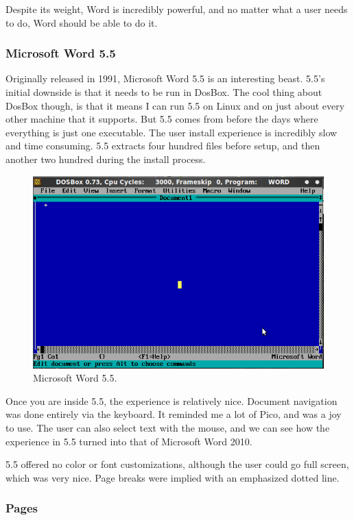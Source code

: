\documentclass[10pt]{article}
\begin{document}
Despite its weight, Word is incredibly powerful, and no matter what a user needs to do, Word should be able to do it.

\subsubsection{Microsoft Word 5.5}

Originally released in 1991\cite{infoworld}, Microsoft Word 5.5 is an interesting beast. 5.5's initial downside is that it needs to be run in DosBox. The cool thing about DosBox though, is that it means I can run 5.5 on Linux and on just about every other machine that it supports. But 5.5 comes from before the days where everything is just one executable. The user install experience is incredibly slow and time consuming. 5.5 extracts four hundred files before setup, and then another two hundred during the install process.

\begin{figure}
   \centering
      \includegraphics[width=130mm]{images/w55_1.png}
   \caption{Microsoft Word 5.5.}
\end{figure}

Once you are inside 5.5, the experience is relatively nice. Document navigation was done entirely via the keyboard. It reminded me a lot of Pico, and was a joy to use. The user can also select text with the mouse, and we can see how the experience in 5.5 turned into that of Microsoft Word 2010.

5.5 offered no color or font customizations, although the user could go full screen, which was very nice. Page breaks were implied with an emphasized dotted line.

\subsubsection{Pages}
\end{document}
